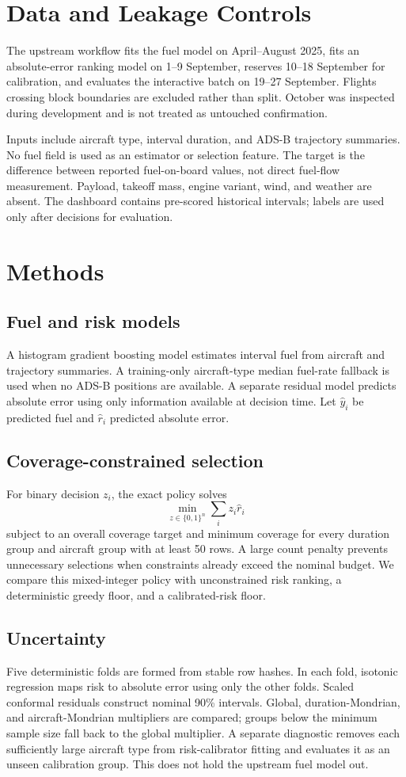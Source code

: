 \documentclass[11pt]{article}
\begin{document}
\section{Data and Leakage Controls}
The upstream workflow fits the fuel model on April--August 2025, fits an absolute-error ranking model on 1--9 September, reserves 10--18 September for calibration, and evaluates the interactive batch on 19--27 September. Flights crossing block boundaries are excluded rather than split. October was inspected during development and is not treated as untouched confirmation.

Inputs include aircraft type, interval duration, and ADS-B trajectory summaries. No fuel field is used as an estimator or selection feature. The target is the difference between reported fuel-on-board values, not direct fuel-flow measurement. Payload, takeoff mass, engine variant, wind, and weather are absent. The dashboard contains pre-scored historical intervals; labels are used only after decisions for evaluation.

\section{Methods}
\subsection{Fuel and risk models}
A histogram gradient boosting model estimates interval fuel from aircraft and trajectory summaries. A training-only aircraft-type median fuel-rate fallback is used when no ADS-B positions are available. A separate residual model predicts absolute error using only information available at decision time. Let $\hat y_i$ be predicted fuel and $\hat r_i$ predicted absolute error.

\subsection{Coverage-constrained selection}
For binary decision $z_i$, the exact policy solves
\[
  \min_{z\in\{0,1\}^n}\sum_i z_i\hat r_i
\]
subject to an overall coverage target and minimum coverage for every duration group and aircraft group with at least 50 rows. A large count penalty prevents unnecessary selections when constraints already exceed the nominal budget. We compare this mixed-integer policy with unconstrained risk ranking, a deterministic greedy floor, and a calibrated-risk floor.

\subsection{Uncertainty}
Five deterministic folds are formed from stable row hashes. In each fold, isotonic regression maps risk to absolute error using only the other folds. Scaled conformal residuals construct nominal 90\% intervals. Global, duration-Mondrian, and aircraft-Mondrian multipliers are compared; groups below the minimum sample size fall back to the global multiplier. A separate diagnostic removes each sufficiently large aircraft type from risk-calibrator fitting and evaluates it as an unseen calibration group. This does not hold the upstream fuel model out.
\end{document}
